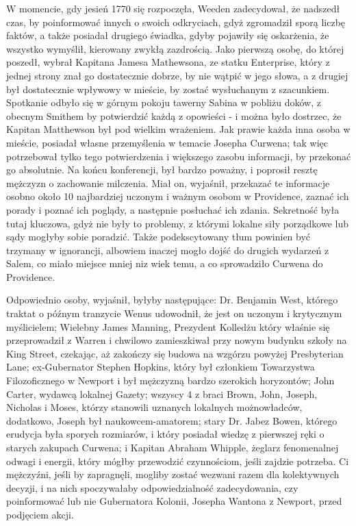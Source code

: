 W momencie, gdy jesień 1770 się rozpoczęła, Weeden zadecydował, że nadszedł czas, by poinformować innych o swoich odkryciach, gdyż zgromadził sporą liczbę faktów, a także posiadał drugiego świadka, gdyby pojawiły się oskarżenia, że wszystko wymyślił, kierowany zwykłą zazdrością. Jako pierwszą osobę, do której poszedł, wybrał Kapitana Jamesa Mathewsona, ze statku Enterprise, który z jednej strony znał go dostatecznie dobrze, by nie wątpić w jego słowa, a z drugiej był dostatecznie wpływowy w mieście, by zostać wysłuchanym z szacunkiem. Spotkanie odbyło się w górnym pokoju tawerny Sabina w pobliżu doków, z obecnym Smithem by potwierdzić każdą z opowieści - i można było dostrzec, że Kapitan Matthewson był pod wielkim wrażeniem. Jak prawie każda inna osoba w mieście, posiadał własne przemyślenia w temacie Josepha Curwena; tak więc potrzebował tylko tego potwierdzenia i większego zasobu informacji, by przekonać go absolutnie. Na końcu konferencji, był bardzo poważny, i poprosił resztę mężczyzn o zachowanie milczenia. Miał on, wyjaśnił, przekazać te informacje osobno około 10 najbardziej uczonym i ważnym osobom w Providence, zaznać ich porady i poznać ich poglądy, a następnie posłuchać ich zdania. Sekretność była tutaj kluczowa, gdyż nie były to problemy, z którymi lokalne siły porządkowe lub sądy mogłyby sobie poradzić. Także podekscytowany tłum powinien być trzymany w ignorancji, albowiem inaczej mogło dojść do drugich wydarzeń z Salem, co miało miejsce mniej niz wiek temu, a co sprowadziło Curwena do Providence.

Odpowiednio osoby, wyjaśnił, byłyby następujące: Dr. Benjamin West, którego traktat o późnym tranzycie Wenus udowodnił, że jest on uczonym i krytycznym myślicielem; Wielebny James Manning, Prezydent Kolledżu który właśnie się przeprowadził z Warren i chwilowo zamieszkiwał przy nowym budynku szkoły na King Street, czekając, aż zakończy się budowa na wzgórzu powyżej Presbyterian Lane; ex-Gubernator Stephen Hopkins, który był członkiem Towarzystwa Filozoficznego w Newport i był mężczyzną bardzo szerokich horyzontów; John Carter, wydawcą lokalnej Gazety; wszyscy 4 z braci Brown, John, Joseph, Nicholas i Moses, którzy stanowili uznanych lokalnych możnowładców, dodatkowo, Joseph był naukowcem-amatorem; stary Dr. Jabez Bowen, którego erudycja była sporych rozmiarów, i który posiadał wiedzę z pierwszej ręki o starych zakupach Curwena; i Kapitan Abraham Whipple, żeglarz fenomenalnej odwagi i energii, który mógłby przewodzić czynnościom, jeśli zajdzie potrzeba. Ci mężczyźni, jeśli by zapragnęli, mogliby zostać wezwani razem dla kolektywnych decyzji, i na nich spoczywałaby odpowiedzialność zadecydowania, czy poinformować lub nie Gubernatora Kolonii, Josepha Wantona z Newport, przed podjęciem akcji. 

